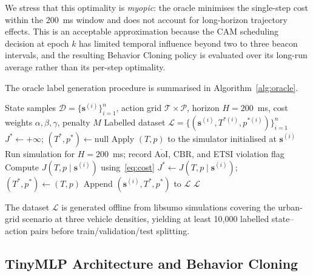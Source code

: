 \documentclass[journal]{IEEEtran}
\begin{document}
\noindent
We stress that this optimality is \emph{myopic}: the oracle minimises
the single-step cost within the 200~ms window and does not account for
long-horizon trajectory effects.  This is an acceptable approximation
because the CAM scheduling decision at epoch $k$ has limited
temporal influence beyond two to three beacon intervals, and the
resulting Behavior Cloning policy is evaluated over its long-run
average rather than its per-step optimality.

The oracle label generation procedure is summarised in
Algorithm~\ref{alg:oracle}.

\begin{algorithm}[!t]
  \caption{Oracle Label Generation via Exhaustive Grid Search}
  \label{alg:oracle}
  \begin{algorithmic}[1]
    \REQUIRE State samples $\mathcal{D} = \{\mathbf{s}^{(i)}\}_{i=1}^{n}$,
             action grid $\mathcal{T} \times \mathcal{P}$,
             horizon $H = 200$~ms,
             cost weights $\alpha, \beta, \gamma$, penalty $M$
    \ENSURE  Labelled dataset
             $\mathcal{L} = \{(\mathbf{s}^{(i)}, T^{*(i)}, p^{*(i)})\}_{i=1}^{n}$
      \STATE $J^{*} \leftarrow +\infty$;
             $(T^{*}, p^{*}) \leftarrow \text{null}$
        \STATE Apply $(T, p)$ to the simulator initialised at
               $\mathbf{s}^{(i)}$
        \STATE Run simulation for $H = 200$~ms; record
               $\overline{\text{AoI}}$, $\text{CBR}$,
               and ETSI violation flag
        \STATE Compute $J(T, p \mid \mathbf{s}^{(i)})$
               using~\eqref{eq:cost}
          \STATE $J^{*} \leftarrow J(T, p \mid \mathbf{s}^{(i)})$;
                 $(T^{*}, p^{*}) \leftarrow (T, p)$
        \ENDIF
      \ENDFOR
      \STATE Append $(\mathbf{s}^{(i)}, T^{*}, p^{*})$ to $\mathcal{L}$
    \ENDFOR
    \RETURN $\mathcal{L}$
  \end{algorithmic}
\end{algorithm}

\noindent
The dataset $\mathcal{L}$ is generated offline from libsumo
simulations covering the urban-grid scenario at three vehicle
densities, yielding at least 10,000 labelled state--action pairs
before train/validation/test splitting.

\subsection{TinyMLP Architecture and Behavior Cloning}
\label{subsec:3}
\end{document}
